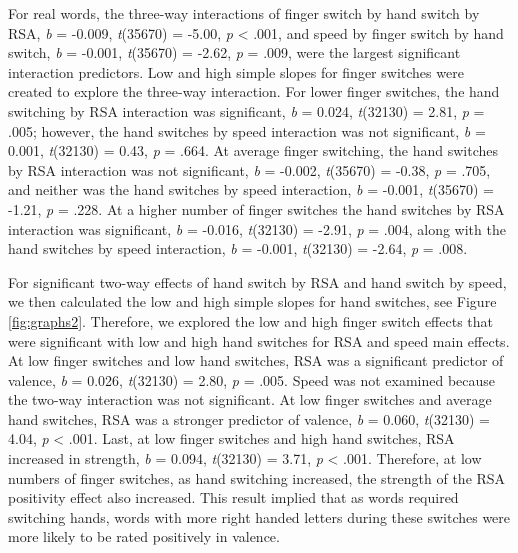 \documentclass[english,man, mask]{apa6}
\theoremstyle{definition}
\theoremstyle{definition}
\theoremstyle{definition}
\theoremstyle{remark}
\begin{document}
For real words, the three-way interactions of finger switch by hand
switch by RSA, \emph{b} = -0.009, \emph{t}(35670) = -5.00, \emph{p}
\textless{} .001, and speed by finger switch by hand switch, \emph{b} =
-0.001, \emph{t}(35670) = -2.62, \emph{p} = .009, were the largest
significant interaction predictors. Low and high simple slopes for
finger switches were created to explore the three-way interaction. For
lower finger switches, the hand switching by RSA interaction was
significant, \emph{b} = 0.024, \emph{t}(32130) = 2.81, \emph{p} = .005;
however, the hand switches by speed interaction was not significant,
\emph{b} = 0.001, \emph{t}(32130) = 0.43, \emph{p} = .664. At average
finger switching, the hand switches by RSA interaction was not
significant, \emph{b} = -0.002, \emph{t}(35670) = -0.38, \emph{p} =
.705, and neither was the hand switches by speed interaction, \emph{b} =
-0.001, \emph{t}(35670) = -1.21, \emph{p} = .228. At a higher number of
finger switches the hand switches by RSA interaction was significant,
\emph{b} = -0.016, \emph{t}(32130) = -2.91, \emph{p} = .004, along with
the hand switches by speed interaction, \emph{b} = -0.001,
\emph{t}(32130) = -2.64, \emph{p} = .008.

For significant two-way effects of hand switch by RSA and hand switch by
speed, we then calculated the low and high simple slopes for hand
switches, see Figure \ref{fig:graphs2}. Therefore, we explored the low
and high finger switch effects that were significant with low and high
hand switches for RSA and speed main effects. At low finger switches and
low hand switches, RSA was a significant predictor of valence, \emph{b}
= 0.026, \emph{t}(32130) = 2.80, \emph{p} = .005. Speed was not examined
because the two-way interaction was not significant. At low finger
switches and average hand switches, RSA was a stronger predictor of
valence, \emph{b} = 0.060, \emph{t}(32130) = 4.04, \emph{p} \textless{}
.001. Last, at low finger switches and high hand switches, RSA increased
in strength, \emph{b} = 0.094, \emph{t}(32130) = 3.71, \emph{p}
\textless{} .001. Therefore, at low numbers of finger switches, as hand
switching increased, the strength of the RSA positivity effect also
increased. This result implied that as words required switching hands,
words with more right handed letters during these switches were more
likely to be rated positively in valence.
\end{document}
